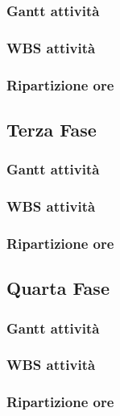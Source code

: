 \subsubsection{Gantt attività}

\subsubsection{WBS attività}

\subsubsection{Ripartizione ore}

\subsection{Terza Fase}
\subsubsection{Gantt attività}

\subsubsection{WBS attività}

\subsubsection{Ripartizione ore}

\subsection{Quarta Fase}
\subsubsection{Gantt attività}

\subsubsection{WBS attività}

\subsubsection{Ripartizione ore}

